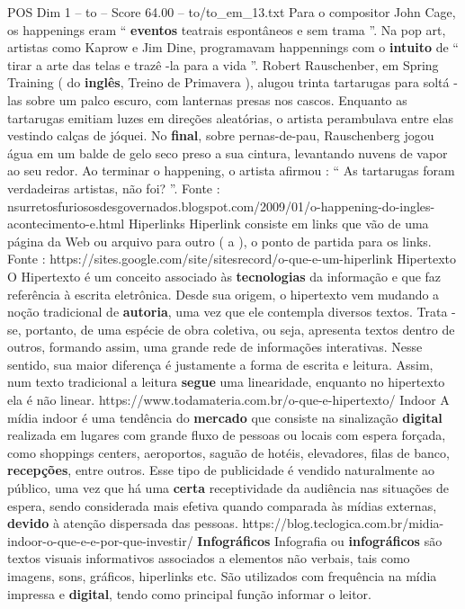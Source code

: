 \begin{textsample}{POS Dim 1 – to – Score 64.00 – to/to\_em\_13.txt}
Para o compositor John Cage, os happenings eram “ \textbf{eventos} teatrais espontâneos e sem trama ”.
Na pop art, artistas como Kaprow e Jim Dine, programavam happennings com o \textbf{intuito} de “ tirar a arte das telas e trazê -la para a vida ”.
Robert Rauschenber, em Spring Training ( do \textbf{inglês}, Treino de Primavera ), alugou trinta tartarugas para soltá -las sobre um palco escuro, com lanternas presas nos cascos.
Enquanto as tartarugas emitiam luzes em direções aleatórias, o artista perambulava entre elas vestindo calças de jóquei.
No \textbf{final}, sobre pernas-de-pau, Rauschenberg jogou água em um balde de gelo seco preso a sua cintura, levantando nuvens de vapor ao seu redor.
Ao terminar o happening, o artista afirmou : “ As tartarugas foram verdadeiras artistas, não foi? ”.
Fonte : nsurretosfuriososdesgovernados.blogspot.com/2009/01/o-happening-do-ingles-acontecimento-e.html Hiperlinks Hiperlink consiste em links que vão de uma página da Web ou arquivo para outro ( a ), o ponto de partida para os links.
Fonte : https://sites.google.com/site/sitesrecord/o-que-e-um-hiperlink Hipertexto O Hipertexto é um conceito associado às \textbf{tecnologias} da informação e que faz referência à escrita eletrônica.
Desde sua origem, o hipertexto vem mudando a noção tradicional de \textbf{autoria}, uma vez que ele contempla diversos textos.
Trata -se, portanto, de uma espécie de obra coletiva, ou seja, apresenta textos dentro de outros, formando assim, uma grande rede de informações interativas.
Nesse sentido, sua maior diferença é justamente a forma de escrita e leitura.
Assim, num texto tradicional a leitura \textbf{segue} uma linearidade, enquanto no hipertexto ela é não linear. https://www.todamateria.com.br/o-que-e-hipertexto/ Indoor A mídia indoor é uma tendência do \textbf{mercado} que consiste na sinalização \textbf{digital} realizada em lugares com grande fluxo de pessoas ou locais com espera forçada, como shoppings centers, aeroportos, saguão de hotéis, elevadores, filas de banco, \textbf{recepções}, entre outros.
Esse tipo de publicidade é vendido naturalmente ao público, uma vez que há uma \textbf{certa} receptividade da audiência nas situações de espera, sendo considerada mais efetiva quando comparada às mídias externas, \textbf{devido} à atenção dispersada das pessoas. https://blog.teclogica.com.br/midia-indoor-o-que-e-e-por-que-investir/ \textbf{Infográficos} Infografia ou \textbf{infográficos} são textos visuais informativos associados a elementos não verbais, tais como imagens, sons, gráficos, hiperlinks etc.
São utilizados com frequência na mídia impressa e \textbf{digital}, tendo como principal função informar o leitor.

\end{textsample}
